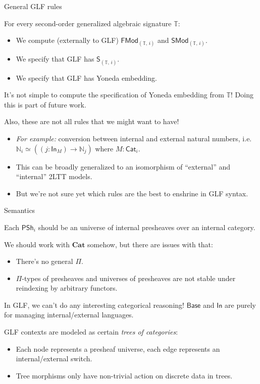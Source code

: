 \documentclass[dvipsnames,aspectratio=169]{beamer}
\newcommand{\mbb}[1]{\mathbb{#1}}
\newcommand{\Base}{\mathsf{Base}}
\newcommand{\In}{\mathsf{In}}
\newcommand{\PSh}{\mathsf{PSh}}
\newcommand{\Cat}{\mathsf{Cat}}
\newcommand{\SMod}{\mathsf{SMod}}
\newcommand{\FMod}{\mathsf{FMod}}
\newcommand{\bCat}{\mathbf{Cat}}
\renewcommand{\S}{\mathsf{S}}
\begin{document}
\begin{frame}{General GLF rules}

For every second-order generalized algebraic signature $\mbb{T}$:
\begin{itemize}
\item We compute (externally to GLF) $\FMod_{(\mbb{T},\,i)}$ and $\SMod_{(\mbb{T},\,i)}$.
\item We specify that GLF has $\S_{(\mbb{T},\,i)}$.
\item We specify that GLF has Yoneda embedding.
\end{itemize}
\vspace{1em}

It's not simple to compute the specification of Yoneda embedding from $\mbb{T}$!
Doing this is part of future work.

\pause
\vspace{1em}
Also, these are not all rules that we might want to have!
\begin{itemize}
\item \emph{For example:} conversion between internal and external natural numbers, i.e.\
  $\mbb{N}_i \simeq ((j : \In_M) \to \mbb{N}_j)$ where $M : \Cat_i$.
\item This can be broadly generalized to an isomorphism of ``external'' and ``internal''
  2LTT models.
\item But we're not sure yet which rules are the best to enshrine in GLF syntax.
\end{itemize}


\end{frame}

\begin{frame}{Semantics}

Each $\PSh_i$ should be an universe of internal presheaves over an internal category.
\vspace{1em}
\pause

We should work with $\bCat$ somehow, but there are issues with that:
\begin{itemize}
\item There's no general $\Pi$.
\item $\Pi$-types of presheaves and universes of presheaves are not stable under
      reindexing by arbitrary functors.
\end{itemize}
\vspace{1em}
\pause

In GLF, we can't do any interesting categorical reasoning! $\Base$ and $\In$ are purely
for managing internal/external languages.
\vspace{1em}

\pause
GLF contexts are modeled as certain \emph{trees of categories}:
\begin{itemize}
\item Each node represents a presheaf universe, each edge represents an internal/external switch.
\item Tree morphisms only have non-trivial action on discrete data in trees.
\end{itemize}

\end{frame}
\end{document}
